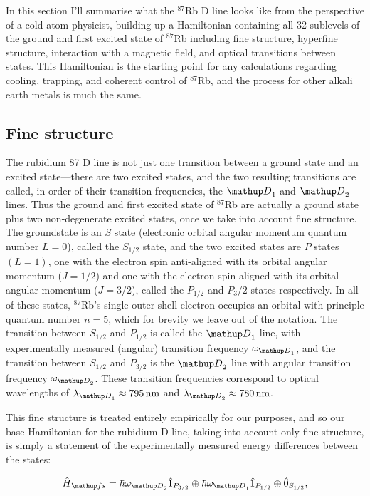 In this section I'll summarise what the $^{87}$Rb D line looks like from the perspective of a cold atom physicist, building up a Hamiltonian containing all 32 sublevels of the ground and first excited state of $^{87}$Rb including fine structure, hyperfine structure, interaction with a magnetic field, and optical transitions between states. This Hamiltonian is the starting point for any calculations regarding cooling, trapping, and coherent control of $^{87}$Rb, and the process for other alkali earth metals is much the same.

\subsection{Fine structure}

The rubidium 87 D line is not just one transition between a ground state and an excited state---there are two excited states, and the two resulting transitions are called, in order of their transition frequencies, the $\up{D}_1$ and  $\up{D}_2$ lines. Thus the ground and first excited state of $^{87}$Rb are actually a ground state plus two non-degenerate excited states, once we take into account fine structure. The groundstate is an $S$ state (electronic orbital angular momentum quantum number $L=0$), called the $S_{1/2}$ state, and the two excited states are $P$ states $(L=1)$, one with the electron spin anti-aligned with its orbital angular momentum ($J=1/2$) and one with the electron spin aligned with its orbital angular momentum ($J=3/2$), called the $P_{1/2}$ and $P_3/2$ states respectively. In all of these states, $^{87}$Rb's single outer-shell electron occupies an orbital with principle quantum number $n=5$, which for brevity we leave out of the notation. The transition between $S_{1/2}$ and $P_{1/2}$ is called the $\up{D}_1$ line, with experimentally measured (angular) transition frequency $\omega_{\up{D}_1}$, and the transition between $S_{1/2}$ and $P_{3/2}$ is the $\up{D}_2$ line with angular transition frequency $\omega_{\up{D}_2}$. These transition frequencies correspond to optical wavelengths of $\lambda_{\up{D}_1} \approx 795\unit{nm}$ and $\lambda_{\up{D}_2} \approx 780\unit{nm}$\cite{steck_rubidium_2010}.

This fine structure is treated entirely empirically for our purposes, and so our base Hamiltonian for the rubidium D line, taking into account only fine structure, is simply a statement of the experimentally measured energy differences between the states:

\begin{align}
\hat H_\up{fs} = 
\hbar\omega_{\up{D}_2} \hat1_{P_{3/2}} \oplus
\hbar\omega_{\up{D}_1} \hat1_{P_{1/2}} \oplus
\hat 0_{S_{1/2}},
\end{align}

